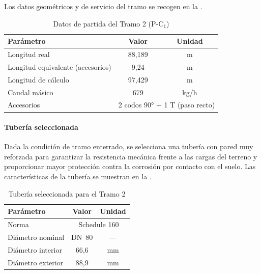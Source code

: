 Los datos geométricos y de servicio del tramo se recogen en la .

\begin{table}[H]
	\centering
	\caption{Datos de partida del Tramo 2 (P-C$_1$)}
	\label{tab:datos-tramo2}
	\begin{tabular}{lcc}
		\toprule
		\textbf{Parámetro}                & \textbf{Valor}                                     & \textbf{Unidad} \\
		\midrule
		Longitud real                     & 88{,}189                                           & m               \\
		Longitud equivalente (accesorios) & 9{,}24                                             & m               \\
		Longitud de cálculo               & 97{,}429                                           & m               \\
		Caudal másico                     & 679                                                & kg/h            \\
		Accesorios                        & \multicolumn{2}{c}{2 codos 90° + 1 T (paso recto)}                   \\
		\bottomrule
	\end{tabular}
\end{table}

\paragraph{Tubería seleccionada}

Dada la condición de tramo enterrado, se selecciona una tubería con pared muy reforzada para garantizar la resistencia mecánica frente a las cargas del terreno y proporcionar mayor protección contra la corrosión por contacto con el suelo. Las características de la tubería se muestran en la .

\begin{table}[H]
	\centering
	\caption{Tubería seleccionada para el Tramo 2}
	\label{tab:tuberia-tramo2}
	\begin{tabular}{lcc}
		\toprule
		\textbf{Parámetro} & \textbf{Valor}                   & \textbf{Unidad} \\
		\midrule
		Norma              & \multicolumn{2}{c}{Schedule 160}                   \\
		Diámetro nominal   & DN~80                            & ---             \\
		Diámetro interior  & 66{,}6                           & mm              \\
		Diámetro exterior  & 88{,}9                           & mm              \\
		\bottomrule
	\end{tabular}
\end{table}

